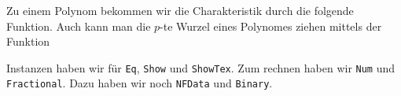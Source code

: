 Zu einem Polynom bekommen wir die Charakteristik durch die folgende Funktion.
Auch kann man die $p$-te Wurzel eines Polynomes ziehen mittels der Funktion

Instanzen haben wir für \texttt{Eq}, \texttt{Show} und \texttt{ShowTex}.
Zum rechnen haben wir \texttt{Num} und \texttt{Fractional}.
Dazu haben wir noch \texttt{NFData} und \texttt{Binary}.

